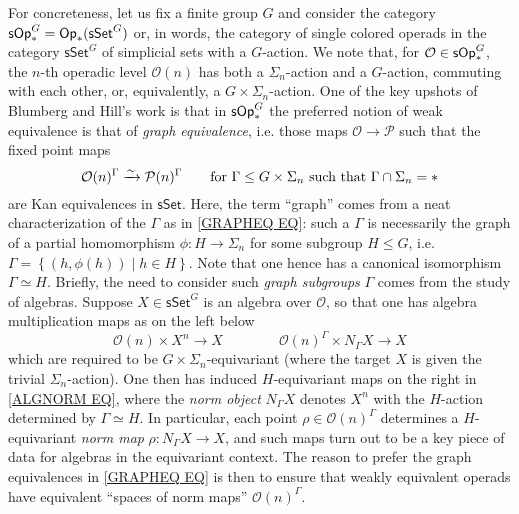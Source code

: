 \documentclass[a4paper,10pt
,draft
]{article}%
\numberwithin{equation}{section}
\numberwithin{figure}{section}
\theoremstyle{definition} %
\newcommand{\sets}[2]{\left\{ #1 \;|\; #2\right\}}%
\renewcommand{\O}{\ensuremath{\mathcal O}}
\newcommand{\1}{\ensuremath{\mathbbm 1}}%
\begin{document}
For concreteness, let us fix a finite group $G$
and consider the category
$\mathsf{sOp}^{G}_{\**} = \mathsf{Op}_{\**}(\mathsf{sSet}^G)$
or, in words,
the category of single colored operads
in the category $\mathsf{sSet}^G$
of simplicial sets with a $G$-action.
We note that, for $\O \in \mathsf{sOp}^{G}_{\**}$,
the $n$-th operadic level $\O(n)$ has both a $\Sigma_n$-action and a $G$-action, commuting with each other, or, equivalently, 
a $G \times \Sigma_n$-action.
One of the key upshots
of Blumberg and Hill's work \cite{BH15}
is that in $\mathsf{sOp}^{G}_{\**}$
the preferred notion of weak equivalence is that of \emph{graph equivalence},
i.e. those maps 
$\O \to \mathcal{P}$
such that the fixed point maps
\begin{equation}\label{GRAPHEQ EQ}
\O(n)^{\Gamma} \xrightarrow{\sim} \mathcal{P}(n)^{\Gamma}
\qquad
\text{for }
\Gamma \leq G \times \Sigma_n
\text{ such that }
\Gamma \cap \Sigma_n = \**
\end{equation}
are Kan equivalences in $\mathsf{sSet}$.
%
Here, the term ``graph'' comes from a neat characterization of the $\Gamma$
as in \eqref{GRAPHEQ EQ}:
such a $\Gamma$ is necessarily the graph of a partial homomorphism
$\phi \colon H \to \Sigma_n$ for some subgroup $H \leq G$,
i.e.
$\Gamma = \sets{(h,\phi(h))}{h \in H}$. 
Note that one hence has a canonical isomorphism $\Gamma \simeq H$.
%
Briefly, the need to consider such \emph{graph subgroups} $\Gamma$ comes from the study of algebras.
Suppose $X \in \mathsf{sSet}^G$ is an algebra over
$\O$,
so that one has algebra multiplication maps
as on the left below
\begin{equation}\label{ALGNORM EQ}
\O(n) \times X^n \to X
\qquad \qquad
\O(n)^{\Gamma} \times N_{\Gamma}X \to X
\end{equation}
which are required to be 
$G \times \Sigma_n$-equivariant
(where the target $X$ is given the trivial $\Sigma_n$-action).
One then has induced 
$H$-equivariant maps 
on the right in \eqref{ALGNORM EQ},
where the \emph{norm object} $N_{\Gamma} X$
denotes $X^{n}$ with the $H$-action determined by $\Gamma \simeq H$.
In particular, each point
$\rho \in \O(n)^{\Gamma}$
determines a $H$-equivariant \emph{norm map}
$\rho \colon N_{\Gamma} X \to X$,  
and such maps turn out to be a key piece of data
for algebras in the equivariant context.
The reason to prefer the graph equivalences in \eqref{GRAPHEQ EQ}
is then to ensure that weakly equivalent operads
have equivalent ``spaces of norm maps'' $\O(n)^{\Gamma}$.
\end{document}
